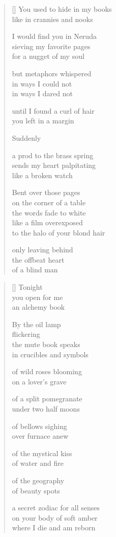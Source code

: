 \documentclass[12pt,a4paper]{article}
\begin{document}
\begin{verse}[\versewidth]
  You used to hide in my books \\
  like in crannies and nooks

  I would find you in Neruda \\
  sieving my favorite pages \\
  for a nugget of my soul

  but metaphors whispered \\
  in ways I could not \\
  in ways I dared not

  until I found a curl of hair \\
  you left in a margin

  Suddenly

  a prod to the brass spring \\
  sends my heart palpitating \\
  like a broken watch

  Bent over those pages \\
  on the corner of a table \\
  the words fade to white \\
  like a film overexposed \\
  to the halo of your blond hair

  only leaving behind \\
  the offbeat heart \\
  of a blind man
\end{verse}


\newpage

\poemtitle{}

\settowidth{\versewidth}{on your body of soft amber}

\bigskip

\begin{verse}[\versewidth]
  Tonight \\
  you open for me \\
  an alchemy book

  By the oil lamp \\
  flickering \\
  the mute book speaks \\
  in crucibles and symbols

  of wild roses blooming \\
  on a lover's grave

  of a split pomegranate \\
  under two half moons

  of bellows sighing \\
  over furnace anew

  of the mystical kiss \\
  of water and fire

  of the geography \\
  of beauty spots

  a secret zodiac for all senses \\
  on your body of soft amber \\
  where I die and am reborn
\end{verse}
\end{document}
